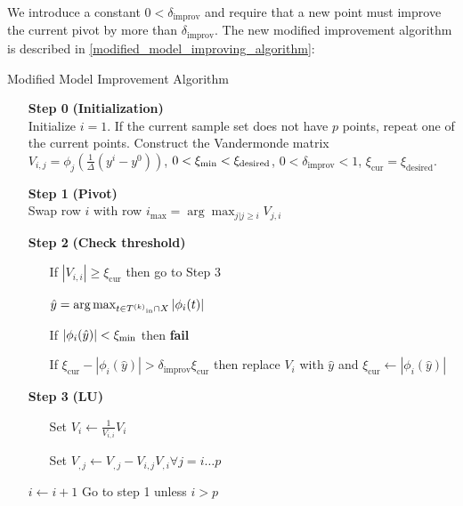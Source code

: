 We introduce a constant $0<\delta_{\text{improv}}$ and require that a new point must improve the current pivot by more than $\delta_{\text{improv}}$.
The new modified improvement algorithm is described in \cref{modified_model_improving_algorithm}:


\begin{algorithm}[H]
    \caption{Modified Model Improvement Algorithm}
    \label{modified_model_improving_algorithm}
    \begin{itemize}
        \item[\textbf{Step 0}] \textbf{(Initialization)} \\
            Initialize $i=1$.
            If the current sample set does not have $p$ points, repeat one of the current points. 
            Construct the Vandermonde matrix $V_{i,j} = \phi_j(\frac 1 {\Delta}(y^i - y^0))$,
            $0 < \xi_{\text{min}} < \xi_{\text{desired}}$, $0 <\delta_{\text{improv}} < 1$,
            $  \xi_{\text{cur}} = \xi_{\text{desired}}$.
            
        \item[\textbf{Step 1}] \textbf{(Pivot)} \\
            Swap row $i$ with row $i_{\max} = \arg \max_{j|j\ge i} V_{j,i} $
        
        \item[\textbf{Step 2}] \textbf{(Check threshold)} \begin{itemize}
                \item[] If $|V_{i,i}| \ge \xi_{\text{cur}} $ then go to Step 3
                \item[] $ \hat y = \arg\max_{t \in {T^{(k)}}_{\text{in}} \cap X} |\phi_i(t)|$
                \item[] If $\label{impossibly_poised} |\phi_i(\hat y)| < \xi_{\text{min}}$ then \textbf{fail}
                \item[] If $\xi_{\text{cur}} - |\phi_i(\hat y)| > \delta_{\text{improv}} \xi_{\text{cur}}$ then replace $V_i$ with $\hat y$ and $\xi_{\text{cur}} \gets |\phi_i(\hat y)|$
            \end{itemize}
        
        \item[\textbf{Step 3}] \textbf{(LU)} \begin{itemize}
                \item[] Set $V_i \gets \frac{1}{V_{i,i}} V_i$
                \item[] Set $V_{,j} \gets V_{, j} - V_{i,j} V_{, i} \forall j=i \ldots p$
            \end{itemize}
            $i \gets i+1$
            Go to step 1 unless $i > p$
    \end{itemize}
\end{algorithm}

